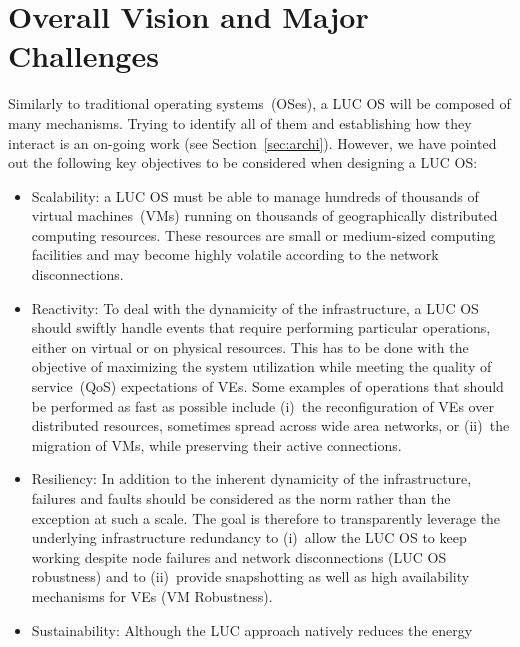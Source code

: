 \section{Overall Vision and Major Challenges\label{sec:challenges}}

Similarly to traditional operating systems~(OSes), a LUC OS will be composed of
many mechanisms. Trying to identify all of them and establishing how they
interact is an on-going work (see Section~\ref{sec:archi}). However,
we have pointed out the following
key objectives to be considered when designing a LUC OS:

\begin{itemize} 
\item Scalability: a LUC OS must be able to manage hundreds of
  thousands of virtual machines~(VMs) running on thousands of 
  geographically distributed computing resources.  These resources are small or
  medium-sized computing facilities and may become highly volatile according to the network disconnections.  
\item Reactivity: To deal with the dynamicity of the infrastructure, a LUC OS
  should swiftly handle events that require performing particular
  operations, either on virtual or on physical resources. This has to be done with the
  objective of maximizing the system utilization while meeting the quality of service~(QoS) expectations of VEs. 
  Some examples of operations that should be performed as fast as possible include (i)~the reconfiguration
  of VEs over distributed resources, sometimes spread across wide area networks, or (ii)~the migration of VMs, 
  while preserving their active connections.
\item Resiliency: In addition to the inherent dynamicity of the
  infrastructure, failures and faults should be considered as the norm rather than the
exception at such a scale. The goal is therefore to transparently leverage the
underlying infrastructure redundancy to (i)~allow the LUC OS to keep
working despite node failures and network disconnections (LUC OS robustness) and to (ii)~provide
snapshotting as well as high availability mechanisms for VEs (VM Robustness).
\item Sustainability: Although the LUC approach natively reduces the energy

\end{itemize}
